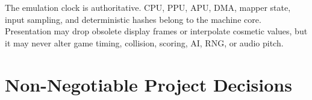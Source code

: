 \documentclass[10pt,letterpaper]{article}
\begin{document}
\begin{center}
\end{center}

The emulation clock is authoritative. CPU, PPU, APU, DMA, mapper state, input sampling, and deterministic hashes belong to the machine core. Presentation may drop obsolete display frames or interpolate cosmetic values, but it may never alter game timing, collision, scoring, AI, RNG, or audio pitch.

\section{Non-Negotiable Project Decisions}
\end{document}

